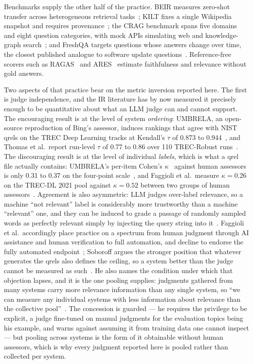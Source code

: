 \documentclass[acmsmall,anonymous,screen]{acmart}
\begin{document}
Benchmarks supply the other half of the practice. BEIR measures zero-shot
transfer across heterogeneous retrieval tasks~\cite{thakur2021beir}; KILT fixes a
single Wikipedia snapshot and requires provenance~\cite{petroni2021kilt}; the
CRAG benchmark spans five domains and eight question categories, with mock APIs
simulating web and knowledge-graph search~\cite{yang2024}; and FreshQA targets
questions whose answers change over time, the closest published analogue to
software update questions~\cite{vu2024freshllms}. Reference-free scorers such as
RAGAS~\cite{es2024ragas} and ARES~\cite{saadfalcon2024ares} estimate
faithfulness and relevance without gold answers.

Two aspects of that practice bear on the metric inversion reported here. The
first is judge independence, and the IR literature has by now measured it
precisely enough to be quantitative about what an LLM judge can and cannot
support. The encouraging result is at the level of system \emph{ordering}:
UMBRELA, an open-source reproduction of Bing's assessor, induces rankings that
agree with NIST qrels on the TREC Deep Learning tracks at Kendall's $\tau$ of
0.873 to 0.944~\cite{upadhyay2024umbrela}, and Thomas et al.\ report run-level
$\tau$ of 0.77 to 0.86 over 110 TREC-Robust runs~\cite{thomas2024preferences}.
The discouraging result is at the level of individual \emph{labels}, which is
what a qrel file actually contains: UMBRELA's per-item Cohen's
$\kappa$~\cite{cohen1960coefficient} against
human assessors is only 0.31 to 0.37 on the four-point
scale~\cite{upadhyay2024umbrela}, and Faggioli et al.\ measure $\kappa=0.26$ on
the TREC-DL 2021 pool against $\kappa=0.52$ between two groups of human
assessors~\cite{faggioli2023perspectives}. Agreement is also asymmetric:
LLM judges over-label relevance, so a machine ``not relevant'' label is
considerably more trustworthy than a machine ``relevant'' one, and they can be
induced to grade a passage of randomly sampled words as perfectly relevant
simply by injecting the query string into
it~\cite{alaofi2024fooled}. Faggioli et al.\ accordingly place practice on a
spectrum from human judgment through AI assistance and human verification to
full automation, and decline to endorse the fully automated
endpoint~\cite{faggioli2023perspectives}; Soboroff argues the stronger position
that whatever generates the qrels also defines the ceiling, so a system better
than the judge cannot be measured as
such~\cite{soboroff2025dontuse}. He also names the condition under which that
objection lapses, and it is the one pooling supplies: judgments gathered from
many systems carry more relevance information than any single system, so ``we
can measure any individual systems with less information about relevance than
the collective pool''~\cite{soboroff2025dontuse}. The concession is guarded ---
he requires the privilege to be explicit, a judge fine-tuned on manual
judgments for the evaluation topics being his example, and warns against
assuming it from training data one cannot inspect --- but pooling across
systems is the form of it obtainable without human assessors, which is why
every judgment reported here is pooled rather than collected per system.
\end{document}

